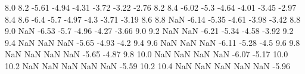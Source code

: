   8.0   8.2     -5.61     -4.94     -4.31     -3.72     -3.22     -2.76
  8.2   8.4     -6.02     -5.3     -4.64     -4.01     -3.45     -2.97
  8.4   8.6     -6.4     -5.7     -4.97     -4.3     -3.71     -3.19
  8.6   8.8    NaN  -6.14     -5.35     -4.61     -3.98     -3.42
  8.8   9.0    NaN  -6.53     -5.7     -4.96     -4.27     -3.66
  9.0   9.2    NaN NaN  -6.21     -5.34     -4.58     -3.92
  9.2   9.4    NaN NaN NaN  -5.65     -4.93     -4.2
  9.4   9.6    NaN NaN NaN  -6.11     -5.28     -4.5
  9.6   9.8    NaN NaN NaN NaN  -5.65     -4.87
  9.8   10.0    NaN NaN NaN NaN  -6.07     -5.17
  10.0   10.2    NaN NaN NaN NaN NaN  -5.59
  10.2   10.4    NaN NaN NaN NaN NaN  -5.96
